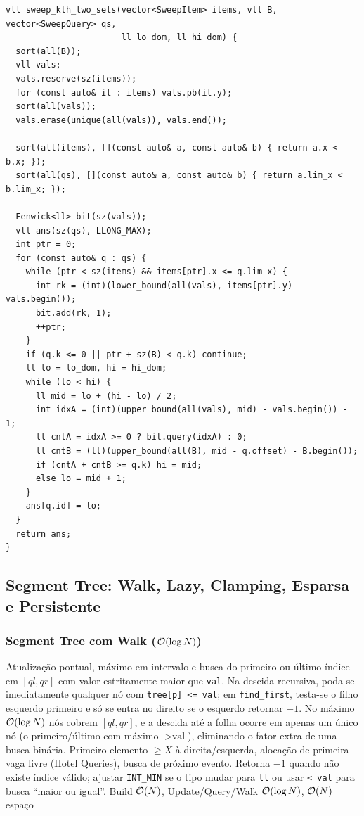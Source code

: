 \begin{lstlisting}
vll sweep_kth_two_sets(vector<SweepItem> items, vll B, vector<SweepQuery> qs,
                       ll lo_dom, ll hi_dom) {
  sort(all(B));
  vll vals;
  vals.reserve(sz(items));
  for (const auto& it : items) vals.pb(it.y);
  sort(all(vals));
  vals.erase(unique(all(vals)), vals.end());

  sort(all(items), [](const auto& a, const auto& b) { return a.x < b.x; });
  sort(all(qs), [](const auto& a, const auto& b) { return a.lim_x < b.lim_x; });

  Fenwick<ll> bit(sz(vals));
  vll ans(sz(qs), LLONG_MAX);
  int ptr = 0;
  for (const auto& q : qs) {
    while (ptr < sz(items) && items[ptr].x <= q.lim_x) {
      int rk = (int)(lower_bound(all(vals), items[ptr].y) - vals.begin());
      bit.add(rk, 1);
      ++ptr;
    }
    if (q.k <= 0 || ptr + sz(B) < q.k) continue;
    ll lo = lo_dom, hi = hi_dom;
    while (lo < hi) {
      ll mid = lo + (hi - lo) / 2;
      int idxA = (int)(upper_bound(all(vals), mid) - vals.begin()) - 1;
      ll cntA = idxA >= 0 ? bit.query(idxA) : 0;
      ll cntB = (ll)(upper_bound(all(B), mid - q.offset) - B.begin());
      if (cntA + cntB >= q.k) hi = mid;
      else lo = mid + 1;
    }
    ans[q.id] = lo;
  }
  return ans;
}
\end{lstlisting}

\subsection{Segment Tree: Walk, Lazy, Clamping, Esparsa e Persistente}

\subsubsection{Segment Tree com Walk ($\mathcal{O}(\log N)$)}
\algobox
  {Atualização pontual, máximo em intervalo e busca do primeiro ou último índice em $[ql, qr]$ com valor estritamente maior que \texttt{val}.}
  {Na descida recursiva, poda-se imediatamente qualquer nó com \texttt{tree[p] <= val}; em \texttt{find\_first}, testa-se o filho esquerdo primeiro e só se entra no direito se o esquerdo retornar $-1$.}
  {No máximo $\mathcal{O}(\log N)$ nós cobrem $[ql, qr]$, e a descida até a folha ocorre em apenas um único nó (o primeiro/último com máximo $> \text{val}$), eliminando o fator extra de uma busca binária.}
  {Primeiro elemento $\ge X$ à direita/esquerda, alocação de primeira vaga livre (Hotel Queries), busca de próximo evento.}
  {Retorna $-1$ quando não existe índice válido; ajustar \texttt{INT\_MIN} se o tipo mudar para \texttt{ll} ou usar \texttt{< val} para busca ``maior ou igual''.}
  {Build $\mathcal{O}(N)$, Update/Query/Walk $\mathcal{O}(\log N)$, $\mathcal{O}(N)$ espaço}

